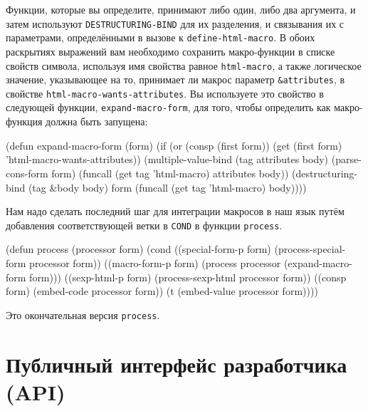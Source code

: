Функции, которые вы определите, принимают либо один, либо два аргумента, и затем
используют \lstinline{DESTRUCTURING-BIND} для их разделения, и связывания их с параметрами,
определёнными в вызове к \lstinline{define-html-macro}.  В обоих раскрытиях выражений вам
необходимо сохранить макро-функции в списке свойств символа, используя имя свойства равное
\lstinline{html-macro}, а также логическое значение, указывающее на то, принимает ли макрос
параметр \lstinline!&attributes!, в свойстве \lstinline{html-macro-wants-attributes}.  Вы
используете это свойство в следующей функции, \lstinline{expand-macro-form}, для того, чтобы
определить как макро-функция должна быть запущена:

\begin{myverb}
(defun expand-macro-form (form)
  (if (or (consp (first form))
          (get (first form) 'html-macro-wants-attributes))
    (multiple-value-bind (tag attributes body) (parse-cons-form form)
      (funcall (get tag 'html-macro) attributes body))
    (destructuring-bind (tag &body body) form
      (funcall (get tag 'html-macro) body))))
\end{myverb}

Нам надо сделать последний шаг для интеграции макросов в наш язык путём добавления
соответствующей ветки в \lstinline{COND} в функции \lstinline{process}.

\begin{myverb}
(defun process (processor form)
  (cond
    ((special-form-p form) (process-special-form processor form))
    ((macro-form-p form)   (process processor (expand-macro-form form)))
    ((sexp-html-p form)    (process-sexp-html processor form))
    ((consp form)          (embed-code processor form))
    (t                     (embed-value processor form))))
\end{myverb}

Это окончательная версия \lstinline{process}.

\section{Публичный интерфейс разработчика (API)}

